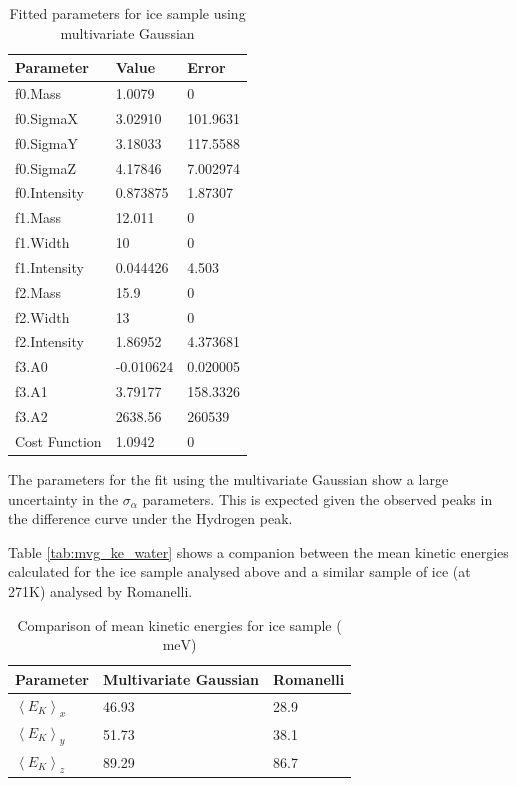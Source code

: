 \documentclass[a4paper]{article}
\begin{document}
\begin{table}[h!]
  \centering
  \begin{tabular}{lll}
    \toprule
    Parameter     & Value     & Error    \\
    \midrule
    f0.Mass       & 1.0079    & 0        \\
    f0.SigmaX     & 3.02910   & 101.9631 \\
    f0.SigmaY     & 3.18033   & 117.5588 \\
    f0.SigmaZ     & 4.17846   & 7.002974 \\
    f0.Intensity  & 0.873875  & 1.87307  \\
    f1.Mass       & 12.011    & 0        \\
    f1.Width      & 10        & 0        \\
    f1.Intensity  & 0.044426  & 4.503    \\
    f2.Mass       & 15.9      & 0        \\
    f2.Width      & 13        & 0        \\
    f2.Intensity  & 1.86952   & 4.373681 \\
    f3.A0         & -0.010624 & 0.020005 \\
    f3.A1         & 3.79177   & 158.3326 \\
    f3.A2         & 2638.56   & 260539   \\
    Cost Function & 1.0942    & 0        \\
    \bottomrule
  \end{tabular}
  \caption{Fitted parameters for ice sample using multivariate Gaussian}
  \label{tab:mvg_ice_params}
\end{table}
\FloatBarrier

The parameters for the fit using the multivariate Gaussian show a large
uncertainty in the $\sigma_{\alpha}$ parameters. This is expected given the
observed peaks in the difference curve under the Hydrogen peak.

Table \ref{tab:mvg_ke_water} shows a companion between the mean kinetic energies
calculated for the ice sample analysed above and a similar sample of ice (at
271K) analysed by Romanelli.

\begin{table}[h!]
  \centering
  \begin{tabular}{lll}
    \toprule
    Parameter                 & Multivariate Gaussian & Romanelli \cite{Romanelli2015} \\
    \midrule
    $\left<E_{K}\right>_{x}$  & 46.93                 & 28.9                           \\
    $\left<E_{K}\right>_{y}$  & 51.73                 & 38.1                           \\
    $\left<E_{K}\right>_{z}$  & 89.29                 & 86.7                           \\
    \bottomrule
  \end{tabular}
  \caption{Comparison of mean kinetic energies for ice sample ($\mathrm{meV}$)}
  \label{tab:mvg_ke_ice}
\end{table}
\FloatBarrier
\end{document}
